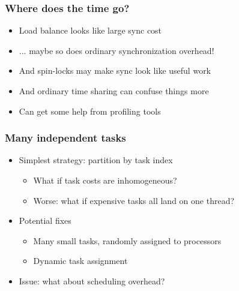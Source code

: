 \documentclass{beamer}
\begin{document}
\begin{frame}
  \frametitle{Where does the time go?}

  \begin{itemize}
  \item
    Load balance looks like large sync cost
  \item
    ... maybe so does ordinary synchronization overhead!
  \item
    And spin-locks may make sync look like useful work
  \item
    And ordinary time sharing can confuse things more
  \item
    Can get some help from profiling tools
  \end{itemize}
\end{frame}


\begin{frame}
  \frametitle{Many independent tasks}
  
  \begin{center}
  \end{center}

  \begin{itemize}
  \item Simplest strategy: partition by task index
    \begin{itemize}
    \item What if task costs are inhomogeneous?
    \item Worse: what if expensive tasks all land on one thread?
    \end{itemize}
  \item Potential fixes
    \begin{itemize}
    \item Many small tasks, randomly assigned to processors
    \item Dynamic task assignment
    \end{itemize}
  \item Issue: what about scheduling overhead?
  \end{itemize}
\end{frame}
  
\end{document}
